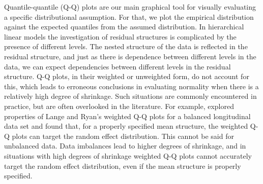 \documentclass[12pt]{article} %
\newcommand{\al}[1]{{\color{red} #1}}
\begin{document}
Quantile-quantile (Q-Q) plots \citep{Wilk:1968} are our main graphical tool for  visually evaluating a specific distributional assumption. For that, we plot the empirical distribution against the expected quantiles from the assumed distribution. 
In hierarchical linear models the investigation of residual structures is complicated by the presence of  different levels. 
The nested structure of the data is reflected in the residual structure, and just as there is dependence between different levels in the data, we can expect dependencies between different levels in the residual structure. 
Q-Q plots, in their weighted \citep{Dempster:1985tr, Lange:1989uu} or unweighted {form}, do not account for this, which leads to erroneous conclusions in evaluating normality when there is a relatively high degree of shrinkage. Such situations are commonly encountered in practice, but are often overlooked in the literature. For example, \cite{Eberly:2005ee} explored properties of Lange and Ryan's weighted Q-Q plots for a balanced longitudinal data set and found that, for a properly specified mean structure, the weighted Q-Q plots can target the random effect distribution. This cannot be said for unbalanced data. Data imbalances lead to higher degrees of shrinkage, and in situations with high degrees of shrinkage weighted Q-Q plots  cannot accurately target the random effect distribution, even if the mean structure is properly specified.



\end{document}
